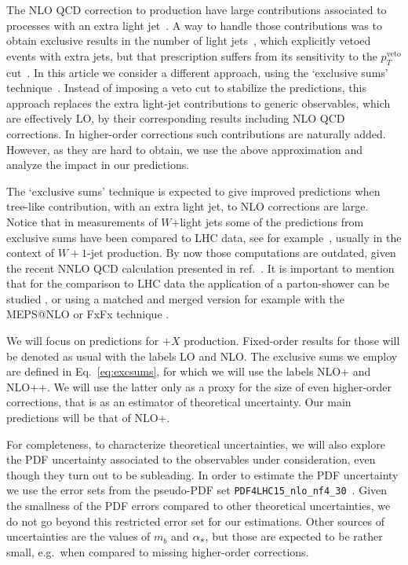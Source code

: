 The NLO QCD correction to \Wbb{} production have large contributions associated to
processes with an extra light jet~\cite{Ellis:1998fv,FebresCordero:2006sj,Cordero:2009kv}.
 A way to handle those
contributions was to obtain exclusive results in the number of light
jets~\cite{FebresCordero:2006sj}, which explicitly vetoed
events with extra jets, but that prescription suffers from its sensitivity
to the $p_T^\mathrm{veto}$ cut~\cite{Tackmann:2012bt}. 
In this article we consider a different approach, using the `exclusive sums'
technique~\cite{ESums}.
Instead of imposing a veto cut to stabilize the predictions, this approach
replaces the extra light-jet contributions to generic observables,
which are effectively LO, by their corresponding results including NLO QCD
corrections. In higher-order corrections such contributions are naturally
added. However, as they are hard to obtain, we use the above
approximation and analyze the impact in our predictions.


The `exclusive sums' technique is expected to give improved predictions when
tree-like contribution, with an extra light jet, to NLO corrections are 
large. Notice that in measurements of $W$+light jets some of the predictions
from exclusive sums have been compared to LHC data, see for
example~\cite{Aad:2014qxa,ATLAS:ratio2017}, usually in the context of $W+1$-jet production. By
now those computations are outdated, given the recent NNLO QCD calculation
presented in ref.~\cite{Boughezal:2015dva}. It is important to mention that for the comparison to LHC data the
application of a parton-shower can be studied \cite{Luisoni:2015mpa}, or using a
matched and merged version for example with the MEPS@NLO \cite{Hoeche:2012yf} or FxFx technique \cite{Frederix:2012ps}.


We will focus on predictions for \Wbb$+X$ production. Fixed-order
results for those will be denoted as usual with the labels LO and NLO. The
exclusive sums we employ are defined in Eq.~\eqref{eq:excsums}, for which we
will use the labels NLO+ and NLO++.
We will use the latter only as a proxy for the size of even
higher-order corrections, that is as an estimator of theoretical uncertainty.
Our main predictions will be that of NLO+.

For completeness, to characterize theoretical uncertainties, we will also explore the PDF uncertainty associated to the
observables under consideration, even though 
they turn out to be subleading. In order to estimate the PDF uncertainty we use
the error sets from the pseudo-PDF set
\texttt{PDF4LHC15\_nlo\_nf4\_30}~\cite{Butterworth:2015oua}. 
Given the smallness of the PDF errors compared to
other theoretical uncertainties, we do not go beyond this
restricted error set for our estimations. Other sources of
uncertainties are the values of $m_b$ and $\alpha_s$, but those are expected to
be rather small, e.g.\ when compared to missing higher-order corrections.

